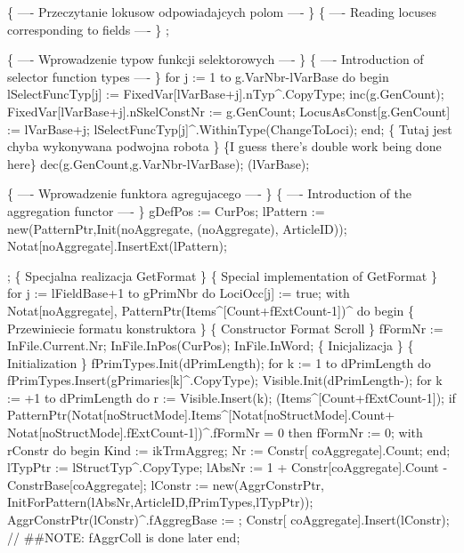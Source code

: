    \{ ---- Przeczytanie lokusow odpowiadajcych polom ---- \}
   \{ ---- Reading locuses corresponding to fields ---- \}
   ;
   
   \{ ---- Wprowadzenie typow funkcji selektorowych ---- \}
   \{ ---- Introduction of selector function types ---- \}
   for j := 1 to g.VarNbr-lVarBase do
   begin
      lSelectFuncTyp[j] := FixedVar[lVarBase+j].nTyp^.CopyType;
      inc(g.GenCount);
      FixedVar[lVarBase+j].nSkelConstNr := g.GenCount;
      LocusAsConst[g.GenCount] := lVarBase+j;
      lSelectFuncTyp[j]^.WithinType(ChangeToLoci);
   end;
   \{ Tutaj jest chyba wykonywana podwojna robota \}
   \{I guess there's double work being done here\}
   dec(g.GenCount,g.VarNbr-lVarBase);
   (lVarBase);
   
   \{ ---- Wprowadzenie funktora agregujacego ---- \}
   \{ ---- Introduction of the aggregation functor ---- \}
   gDefPos := CurPos;
   lPattern := new(PatternPtr,Init(noAggregate, (noAggregate),
                                   ArticleID));
   Notat[noAggregate].InsertExt(lPattern);
   
   ;
   \{ Specjalna realizacja GetFormat \}
   \{ Special implementation of GetFormat \}
   for j := lFieldBase+1 to gPrimNbr do LociOcc[j] := true;
   with Notat[noAggregate], PatternPtr(Items^[Count+fExtCount-1])^ do
   begin
      \{ Przewiniecie formatu konstruktora \}
      \{ Constructor Format Scroll \}
      fFormNr := InFile.Current.Nr; InFile.InPos(CurPos); InFile.InWord;
      \{ Inicjalizacja \} \{ Initialization \}
      fPrimTypes.Init(dPrimLength);
      for k := 1 to dPrimLength do
         fPrimTypes.Insert(gPrimaries[k]^.CopyType);
      Visible.Init(dPrimLength-);
      for k := +1 to dPrimLength do r := Visible.Insert(k);
      (Items^[Count+fExtCount-1]);
      if PatternPtr(Notat[noStructMode].Items^[Notat[noStructMode].Count+
                                                  Notat[noStructMode].fExtCount-1])^.fFormNr = 0 then
         fFormNr := 0;
      with rConstr do
      begin Kind := ikTrmAggreg; Nr :=  Constr[ coAggregate].Count; end;
      lTypPtr := lStructTyp^.CopyType;
      lAbsNr :=  1 + Constr[coAggregate].Count - ConstrBase[coAggregate];
      lConstr :=  new(AggrConstrPtr,
                      InitForPattern(lAbsNr,ArticleID,fPrimTypes,lTypPtr));
      AggrConstrPtr(lConstr)^.fAggregBase :=  ;
      Constr[ coAggregate].Insert(lConstr);
      // ##NOTE: fAggrColl is done later
   end;
   
